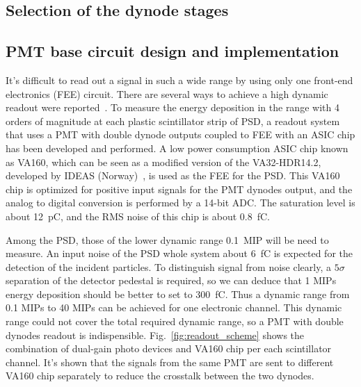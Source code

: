 \documentclass[5p, times]{elsarticle}
\begin{document}
\subsection{Selection of the dynode stages}

\subsection{PMT base circuit design and implementation}

It's difficult to read out a signal in such a wide range by using only one front-end electronics (FEE) circuit. 
There are several ways to achieve a high dynamic readout were reported~\cite{katayose2008development,kampert1994high,zhang2012high}. 
To measure the energy deposition in the range with 4 orders of magnitude at each plastic scintillator strip of PSD, a readout system that uses a PMT with double dynode outputs coupled to FEE with an ASIC chip has been developed and performed. 
A low power consumption ASIC chip known as VA160, which can be seen as a modified version of the VA32-HDR14.2, developed by IDEAS (Norway)~\cite{va160}, is used as the FEE for the PSD. 
This VA160 chip is optimized for positive input signals for the PMT dynodes output, and the analog to digital conversion is performed by a 14-bit ADC. 
The saturation level is about \SI{12}{\pico\coulomb}, and the RMS noise of this chip is about \SI{0.8}{\femto\coulomb}.

Among the PSD, those of the lower dynamic range \SI{0.1}{MIP} will be need to measure. 
An input noise of the PSD whole system about \SI{6}{\femto\coulomb} is expected for the detection of the incident particles. 
To distinguish signal from noise clearly, a $5\sigma$ separation of the detector pedestal is required, so we can deduce that 1 MIPs energy deposition should be better to set to \SI{300}{\femto\coulomb}. 
Thus a dynamic range from 0.1 MIPs to 40 MIPs can be achieved for one electronic channel.
This dynamic range could not cover the total required dynamic range, so a PMT with double dynodes readout is indispensible. 
Fig.~\ref{fig:readout_scheme} shows the combination of dual-gain photo devices and VA160 chip per each scintillator channel.
It’s shown that the signals from the same PMT are sent to different VA160 chip separately to reduce the crosstalk between the two dynodes.
\end{document}
